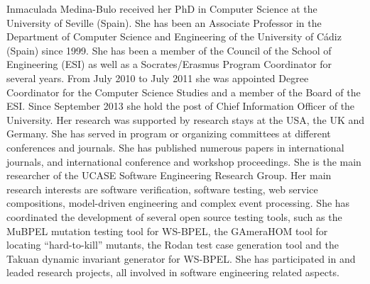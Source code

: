 \documentclass[10pt,journal,compsoc]{IEEEtran}
\begin{document}


\begin{IEEEbiography}{Inmaculada Medina-Bulo}
	  received her PhD in Computer Science at the University of Seville (Spain). She has been an Associate Professor in the Department of Computer Science and Engineering of the University of Cádiz (Spain) since 1999. She has been a member of the Council of the School of Engineering (ESI) as well as a Socrates/Erasmus Program Coordinator for several years. From July 2010 to July 2011 she was appointed Degree Coordinator for the Computer Science Studies and a member of the Board of the ESI. Since September 2013 she hold the post of Chief Information Officer of the University. Her research was supported by research stays at the USA, the UK and Germany. She has served in program or organizing committees at different conferences and journals. She has published numerous papers in international journals, and international conference and workshop proceedings. She is the main researcher of the UCASE Software Engineering Research Group. Her main research interests are software verification, software testing, web service compositions, model-driven engineering and complex event processing. She has coordinated the development of several open source testing tools, such as the MuBPEL mutation testing tool for WS-BPEL, the GAmeraHOM tool for locating “hard-to-kill” mutants, the Rodan test case generation tool and the Takuan dynamic invariant generator for WS-BPEL. She has participated in and leaded research projects, all involved in software engineering related aspects. 
\end{IEEEbiography}
\vfill  %









\end{document}
